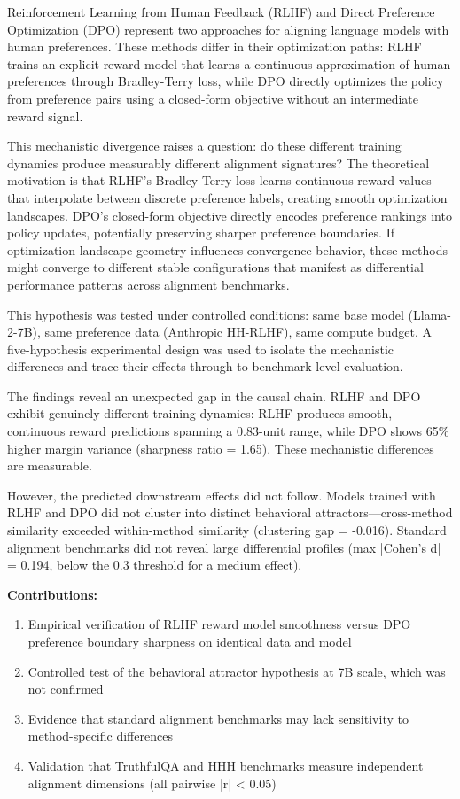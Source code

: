 
Reinforcement Learning from Human Feedback (RLHF) and Direct Preference Optimization (DPO) represent two approaches for aligning language models with human preferences. These methods differ in their optimization paths: RLHF trains an explicit reward model that learns a continuous approximation of human preferences through Bradley-Terry loss, while DPO directly optimizes the policy from preference pairs using a closed-form objective without an intermediate reward signal.

This mechanistic divergence raises a question: do these different training dynamics produce measurably different alignment signatures? The theoretical motivation is that RLHF's Bradley-Terry loss learns continuous reward values that interpolate between discrete preference labels, creating smooth optimization landscapes. DPO's closed-form objective directly encodes preference rankings into policy updates, potentially preserving sharper preference boundaries. If optimization landscape geometry influences convergence behavior, these methods might converge to different stable configurations that manifest as differential performance patterns across alignment benchmarks.

This hypothesis was tested under controlled conditions: same base model (Llama-2-7B), same preference data (Anthropic HH-RLHF), same compute budget. A five-hypothesis experimental design was used to isolate the mechanistic differences and trace their effects through to benchmark-level evaluation.

The findings reveal an unexpected gap in the causal chain. RLHF and DPO exhibit genuinely different training dynamics: RLHF produces smooth, continuous reward predictions spanning a 0.83-unit range, while DPO shows 65\% higher margin variance (sharpness ratio = 1.65). These mechanistic differences are measurable.

However, the predicted downstream effects did not follow. Models trained with RLHF and DPO did not cluster into distinct behavioral attractors---cross-method similarity exceeded within-method similarity (clustering gap = -0.016). Standard alignment benchmarks did not reveal large differential profiles (max |Cohen's d| = 0.194, below the 0.3 threshold for a medium effect).

\textbf{Contributions:}
\begin{enumerate}
\item Empirical verification of RLHF reward model smoothness versus DPO preference boundary sharpness on identical data and model
\item Controlled test of the behavioral attractor hypothesis at 7B scale, which was not confirmed
\item Evidence that standard alignment benchmarks may lack sensitivity to method-specific differences
\item Validation that TruthfulQA and HHH benchmarks measure independent alignment dimensions (all pairwise |r| < 0.05)
\end{enumerate}

